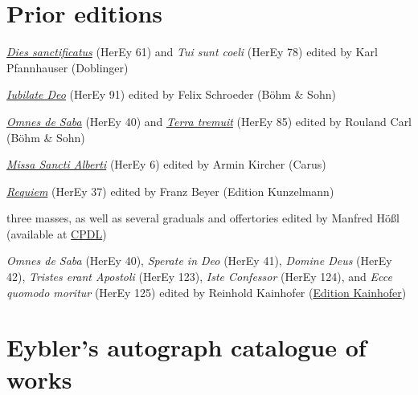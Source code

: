 \documentclass{ees}
\begin{document}
\section{Prior editions}

\begin{bulletlist}
  \item \href{https://www.doblinger.at/shop/okm-00005-st-dies-sanctificatus-tui-sunt-coeli-170430}{\textit{Dies sanctificatus}} (HerEy 61) and \textit{Tui sunt coeli} (HerEy 78) edited by Karl Pfannhauser (Doblinger)
  \item \href{https://boehm-und-sohn.de/produkt/jubilate-deo-4}{\textit{Iubilate Deo}} (HerEy 91) edited by Felix Schroeder (Böhm \& Sohn)
  \item \href{https://boehm-und-sohn.de/produkt/omnes-de-saba}{\textit{Omnes de Saba}} (HerEy 40) and \href{https://boehm-und-sohn.de/produkt/terra-tremuit}{\textit{Terra tremuit}} (HerEy 85) edited by Rouland Carl (Böhm \& Sohn)
  \item \href{https://www.carus-verlag.com/musiknoten-und-aufnahmen/eybler-missa-sancti-alberti-2708400.html}{\textit{Missa Sancti Alberti}} (HerEy 6) edited by Armin Kircher (Carus)
  \item \href{https://www.kunzelmann.ch/en/requiem-oct-10287}{\textit{Requiem}} (HerEy 37) edited by Franz Beyer (Edition Kunzelmann)
  \item three masses, as well as several graduals and offertories edited by Manfred Hößl (available at \href{https://www.cpdl.org/wiki/index.php/Josef_von_Eybler}{CPDL})
  \item \textit{Omnes de Saba} (HerEy 40), \textit{Sperate in Deo} (HerEy 41), \textit{Domine Deus} (HerEy 42), \textit{Tristes erant Apostoli} (HerEy 123), \textit{Iste Confessor} (HerEy 124), and \textit{Ecce quomodo moritur} (HerEy 125) edited by Reinhold Kainhofer (\href{https://edition-kainhofer.com}{Edition Kainhofer})
\end{bulletlist}


\section{Eybler's autograph catalogue of works}
\end{document}
